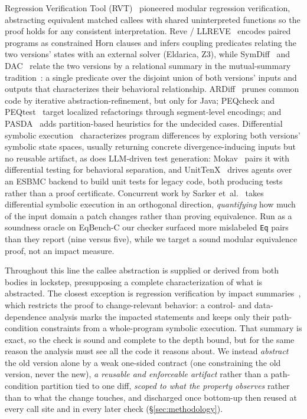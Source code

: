\documentclass[conference]{IEEEtran}
\theoremstyle{definition}
\theoremstyle{remark}
\begin{document}
Regression Verification Tool (RVT)~\cite{godlin2009rv,godlin2013rv}
pioneered modular regression verification, abstracting equivalent
matched callees with shared uninterpreted functions so the proof
holds for any consistent interpretation. Reve /
LLREVE~\cite{felsing2014reve,klebanov2018reve} encodes paired
programs as constrained Horn clauses and infers coupling predicates
relating the two versions' states with an external solver (Eldarica,
Z3), while SymDiff~\cite{lahiri2012symdiff} and
DAC~\cite{lahiri2013dac} relate the two versions by a relational
summary in the mutual-summary tradition~\cite{hawblitzel2013mutual}:
a single predicate over the disjoint union of both versions' inputs
and outputs that characterizes their behavioral relationship.
ARDiff~\cite{badihi2020ardiff} prunes common code by iterative
abstraction-refinement, but only for Java; PEQcheck and
PEQtest~\cite{jakobs2021peqcheck,jakobs2022peqtest} target localized
refactorings through segment-level encodings; and
PASDA~\cite{glock2024pasda} adds partition-based heuristics for the
undecided cases. Differential symbolic
execution~\cite{person2008dse,palikareva2016shadow,spatch2024,cozy2025}
characterizes program differences by exploring both versions'
symbolic state spaces, usually returning concrete divergence-inducing
inputs but no reusable artifact, as does LLM-driven test generation:
Mokav~\cite{etemadi2024mokav} pairs it with differential testing for
behavioral separation, and UnitTenX~\cite{charalambous2025unittenx}
drives agents over an ESBMC backend to build unit tests for legacy
code, both producing tests rather than a proof certificate.
Concurrent work by Sarker
et~al.~\cite{sarker2026quantitativesymbolicpatchimpact} takes
differential symbolic execution in an orthogonal direction,
\emph{quantifying} how much of the input domain a patch changes
rather than proving equivalence. Run as a soundness oracle on
EqBench-C our checker surfaced more mislabeled \texttt{Eq} pairs than
they report (nine versus five), while we target a sound modular
equivalence proof, not an impact measure.

Throughout this line the callee abstraction is supplied or derived from
both bodies in lockstep, presupposing a complete characterization of
what is abstracted. The closest exception is regression verification by
impact summaries~\cite{backes2013impact}, which restricts the proof to
change-relevant behavior: a control- and data-dependence analysis marks
the impacted statements and keeps only their path-condition constraints
from a whole-program symbolic execution. That summary is exact, so the
check is sound and complete to the depth bound, but for the same reason
the analysis must see all the code it reasons about. We instead
\emph{abstract}
the old version alone by a weak one-sided contract (one constraining the
old version, never the new), \textit{a reusable and enforceable artifact}
rather
than a path-condition partition tied to one diff, \textit{scoped to what the
property observes} rather than to what the change touches, and discharged
once bottom-up then reused at every call site and in every later check
(\S\ref{sec:methodology}).
\end{document}
